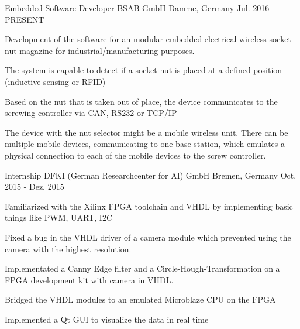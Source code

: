 \begin{cventries}
  \cventry
    {Embedded Software Developer} %
    {BSAB GmbH} %
    {Damme, Germany} %
    {Jul. 2016 - PRESENT} %
    {
      \begin{cvitems} %
        \item {Development of the software for an modular embedded electrical wireless socket nut magazine for industrial/manufacturing purposes.}
        \item {The system is capable to detect if a socket nut is placed at a defined position (inductive sensing or RFID)}
        \item {Based on the nut that is taken out of place, the device communicates to the screwing controller via CAN, RS232 or TCP/IP}
        \item {The device with the nut selector might be a mobile wireless unit. There can be multiple mobile devices, communicating to one base station, which emulates a physical connection to each of the mobile devices to the screw controller.}
      \end{cvitems}
    }

  \cventry
    {Internship} %
    {DFKI (German Researchcenter for AI) GmbH} %
    {Bremen, Germany} %
    {Oct. 2015 - Dez. 2015} %
    {
      \begin{cvitems} %
        \item {Familiarized with the Xilinx FPGA toolchain and VHDL by implementing basic things like PWM, UART, I2C}
        \item {Fixed a bug in the VHDL driver of a camera module which prevented using the camera with the highest resolution.}
        \item {Implementated a Canny Edge filter and a Circle-Hough-Transformation on a FPGA development kit with camera in VHDL.}
        \item {Bridged the VHDL modules to an emulated Microblaze CPU on the FPGA}
        \item {Implemented a Qt GUI to visualize the data in real time}
      \end{cvitems}
    }

\end{cventries}
